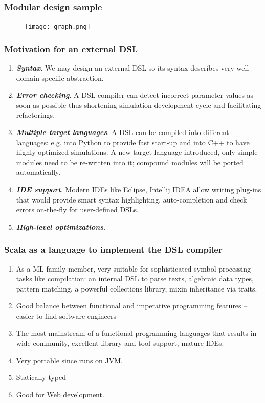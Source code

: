 \documentclass{beamer}
\begin{document}
\begin{frame}
\frametitle{Modular design sample}
\begin{figure}[htbp]
\centering
\texttt{[image: graph.png]}
\end{figure}
\end{frame}
\begin{frame}
\frametitle{Motivation for an external DSL}
\begin{enumerate}
  \item \textbf{\textit{Syntax}}. We may design an external DSL so its syntax describes very well domain specific abstraction.
  \item \textbf{\textit{Error checking}}. A DSL compiler can detect incorrect parameter values as soon as possible thus shortening simulation development cycle and facilitating refactorings.
  \item \textbf{\textit{Multiple target languages}}. A DSL can be compiled into different languages: e.g. into Python to provide fast start-up and into C++ to have highly optimized simulations. A new target language introduced, only simple modules need to be re-written into it; compound modules will be ported automatically.
  \item \textbf{\textit{IDE support}}. Modern IDEs like Eclipse, Intellij IDEA allow writing plug-ins that would provide smart syntax highlighting, auto-completion and check errors on-the-fly for user-defined DSLs.
  \item \textbf{\textit{High-level optimizations}}. 
\end{enumerate}
\end{frame}
\begin{frame}
\frametitle{Scala as a language to implement the DSL compiler}
\begin{enumerate}
  \item As a ML-family member, very suitable for sophisticated symbol processing tasks like compilation: an internal DSL to parse texts, algebraic data types, pattern matching, a powerful collections library, mixin inheritance via traits.
  \item Good balance between functional and imperative programming features -- easier to find software engineers
  \item The most mainstream of a functional programming languages that results in wide community, excellent library and tool support, mature IDEs.
  \item Very portable since runs on JVM.
  \item Statically typed
  \item Good for Web development.
\end{enumerate}
\end{frame}
\end{document}
